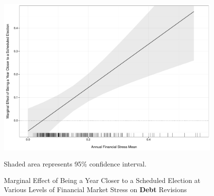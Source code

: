 \documentclass[]{article}
\begin{document}

\begin{landscape}
    
\end{landscape}

\begin{landscape}
    
\end{landscape}


\begin{figure}
    \caption{Marginal Effect of Being a Year Closer to a Scheduled Election at Various Levels of Financial Market Stress on \textbf{Debt} Revisions}
    \label{me_finstress_elect}

    \begin{center}
        \includegraphics[scale=0.4]{figures/fsi_elect_debt_me.pdf}
    \end{center}

	{\scriptsize{Shaded area represents 95\% confidence interval.}}

\end{figure}
\end{document}
